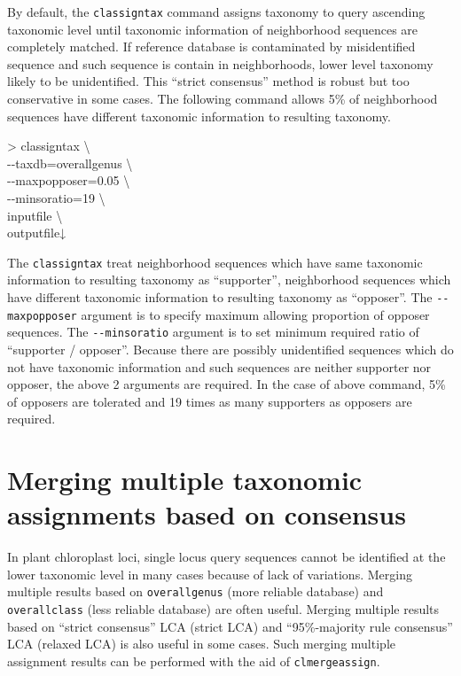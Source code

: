 \documentclass[titlepage,10pt,a4paper,english]{jsbook}
\newenvironment{cmd}{\begin{oframed}\raggedright\ttfamily\footnotesize\setlength{\baselineskip}{1.4em}}{\end{oframed}\vspace{-1em}}
\begin{document}
By default, the \texttt{classigntax} command assigns taxonomy to query ascending taxonomic level until taxonomic information of neighborhood sequences are completely matched.
If reference database is contaminated by misidentified sequence and such sequence is contain in neighborhoods, lower level taxonomy likely to be unidentified.
This ``strict consensus'' method is robust but too conservative in some cases.
The following command allows 5\% of neighborhood sequences have different taxonomic information to resulting taxonomy.

\begin{cmd}
{\textgreater} classigntax {\textbackslash}\\
{-}{-}taxdb=overall{\textunderscore}genus {\textbackslash}\\
{-}{-}maxpopposer=0.05 {\textbackslash}\\
{-}{-}minsoratio=19 {\textbackslash}\\
inputfile {\textbackslash}\\
outputfile↓
\end{cmd}

The \texttt{classigntax} treat neighborhood sequences which have same taxonomic information to resulting taxonomy as ``supporter'', neighborhood sequences which have different taxonomic information to resulting taxonomy as ``opposer''.
The \texttt{{-}{-}maxpopposer} argument is to specify maximum allowing proportion of opposer sequences.
The \texttt{{-}{-}minsoratio} argument is to set minimum required ratio of ``supporter / opposer''.
Because there are possibly unidentified sequences which do not have taxonomic information and such sequences are neither supporter nor opposer, the above 2 arguments are required.
In the case of above command, 5\% of opposers are tolerated and 19 times as many supporters as opposers are required.

\section{Merging multiple taxonomic assignments based on consensus}\label{section:mergingmultipleassignment}

In plant chloroplast loci, single locus query sequences cannot be identified at the lower taxonomic level in many cases because of lack of variations.
Merging multiple results based on \texttt{overall{\textunderscore}genus} (more reliable database) and \texttt{overall{\textunderscore}class} (less reliable database) are often useful.
Merging multiple results based on ``strict consensus'' LCA (strict LCA) and ``95\%-majority rule consensus'' LCA (relaxed LCA) is also useful in some cases.
Such merging multiple assignment results can be performed with the aid of \texttt{clmergeassign}.
\end{document}
